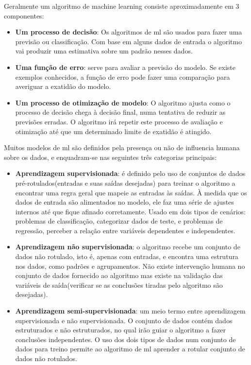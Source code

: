 Geralmente um algoritmo de machine learning consiste aproximadamente em 3 componentes:

\begin{itemize}
\item \textbf{Um processo de decisão}: Os algoritmos de \ac{ml} são usados para fazer uma previsão ou classificação. Com base em alguns dados de entrada o algoritmo vai produzir uma estimativa sobre um padrão nesses dados.
\item \textbf{Uma função de erro}: serve para avaliar a previsão do modelo. Se existe exemplos conhecidos, a função de erro pode fazer uma comparação para averiguar a exatidão do modelo.
\item \textbf{Um processo de otimização de modelo}: O algoritmo ajusta como o processo de decisão chega à decisão final, numa tentativa de reduzir as previsões erradas. O algoritmo irá repetir este processo de avaliação e otimização até que um determinado limite de exatidão é atingido.
\end{itemize}

Muitos modelos de \ac{ml} são definidos pela presença ou não de influencia humana sobre os dados, e  enquadram-se nas seguintes três categorias principais:
\begin{itemize}
\item \textbf{Aprendizagem supervisionada}:  é definido pelo uso de conjuntos de dados pré-rotulados(entradas e suas saídas desejadas) para treinar o algoritmo a encontrar uma regra geral que mapeie as entradas às saídas. À medida que os dados de entrada são alimentados no modelo, ele faz uma série de ajustes internos até que fique afinado corretamente. Usado em dois tipos de cenários: problemas de classificação, categorizar dados de teste, e problemas de regressão, perceber a relação entre variáveis dependentes e independentes.


\item \textbf{Aprendizagem não supervisionada}: o algoritmo recebe um conjunto de dados não rotulado, isto é, apenas com entradas, e encontra uma estrutura nos dados, como padrões e agrupamentos. Não existe intervenção humana no conjunto de dados fornecido ao algoritmo mas existe na validação das variáveis de saída(verificar se as conclusões tiradas pelo algoritmo são desejadas).


\item \textbf{Aprendizagem semi-supervisionada}: um meio termo entre aprendizagem supervisionada e não supervisionada. O conjunto de dados contém  dados estruturados e não estruturados, no qual irão guiar o algoritmo a fazer conclusões independentes. O uso dos dois tipos de dados num conjunto de dados para treino permite ao algoritmo de \ac{ml} aprender a rotular conjunto de dados não rotulados.

\end{itemize}

